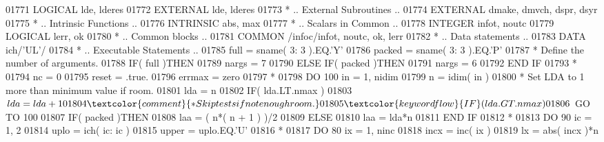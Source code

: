 \begin{DoxyCode}
01771       \textcolor{keywordtype}{LOGICAL}            lde, lderes
01772       \textcolor{keywordtype}{EXTERNAL}           lde, lderes
01773 \textcolor{comment}{*     .. External Subroutines ..}
01774       \textcolor{keywordtype}{EXTERNAL}           dmake, dmvch, dspr, dsyr
01775 \textcolor{comment}{*     .. Intrinsic Functions ..}
01776       \textcolor{keywordtype}{INTRINSIC}          abs, max
01777 \textcolor{comment}{*     .. Scalars in Common ..}
01778       \textcolor{keywordtype}{INTEGER}            infot, noutc
01779       \textcolor{keywordtype}{LOGICAL}            lerr, ok
01780 \textcolor{comment}{*     .. Common blocks ..}
01781       \textcolor{keyword}{COMMON}             /infoc/infot, noutc, ok, lerr
01782 \textcolor{comment}{*     .. Data statements ..}
01783       \textcolor{keyword}{DATA}               ich/\textcolor{stringliteral}{'UL'}/
01784 \textcolor{comment}{*     .. Executable Statements ..}
01785       full = sname( 3: 3 ).EQ.\textcolor{stringliteral}{'Y'}
01786       packed = sname( 3: 3 ).EQ.\textcolor{stringliteral}{'P'}
01787 \textcolor{comment}{*     Define the number of arguments.}
01788       \textcolor{keywordflow}{IF}( full )\textcolor{keywordflow}{THEN}
01789          nargs = 7
01790       \textcolor{keywordflow}{ELSE} \textcolor{keywordflow}{IF}( packed )\textcolor{keywordflow}{THEN}
01791          nargs = 6
01792 \textcolor{keywordflow}{      END IF}
01793 \textcolor{comment}{*}
01794       nc = 0
01795       reset = .true.
01796       errmax = zero
01797 \textcolor{comment}{*}
01798       \textcolor{keywordflow}{DO} 100 in = 1, nidim
01799          n = idim( in )
01800 \textcolor{comment}{*        Set LDA to 1 more than minimum value if room.}
01801          lda = n
01802          \textcolor{keywordflow}{IF}( lda.LT.nmax )
01803      $      lda = lda + 1
01804 \textcolor{comment}{*        Skip tests if not enough room.}
01805          \textcolor{keywordflow}{IF}( lda.GT.nmax )
01806      $      \textcolor{keywordflow}{GO TO} 100
01807          \textcolor{keywordflow}{IF}( packed )\textcolor{keywordflow}{THEN}
01808             laa = ( n*( n + 1 ) )/2
01809          \textcolor{keywordflow}{ELSE}
01810             laa = lda*n
01811 \textcolor{keywordflow}{         END IF}
01812 \textcolor{comment}{*}
01813          \textcolor{keywordflow}{DO} 90 ic = 1, 2
01814             uplo = ich( ic: ic )
01815             upper = uplo.EQ.\textcolor{stringliteral}{'U'}
01816 \textcolor{comment}{*}
01817             \textcolor{keywordflow}{DO} 80 ix = 1, ninc
01818                incx = inc( ix )
01819                lx = abs( incx )*n

\end{DoxyCode}

